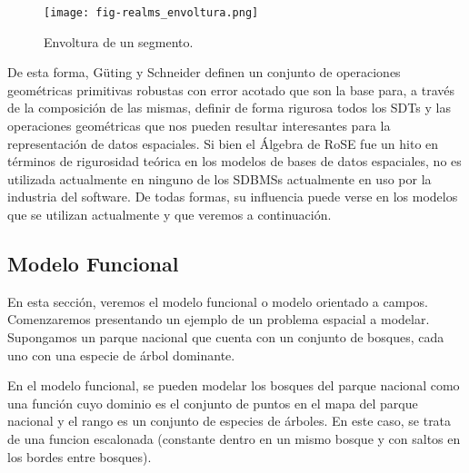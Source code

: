 \begin{figure}
    \centering
    \texttt{[image: fig-realms\_envoltura.png]}
    \caption{Envoltura de un segmento.}
    \label{fig:realms:envoltura}
\end{figure}

De esta forma, Güting y Schneider definen un conjunto de operaciones geométricas primitivas robustas con error acotado que son la base para,
a través de la composición de las mismas, definir de forma rigurosa todos los SDTs
y las operaciones geométricas que nos pueden resultar interesantes para la representación de datos espaciales.
Si bien el Álgebra de RoSE fue un hito en términos de rigurosidad teórica en los modelos de bases de datos espaciales,
no es utilizada actualmente en ninguno de los SDBMSs actualmente en uso por la industria del software.
De todas formas, su influencia puede verse en los modelos que se utilizan actualmente y que veremos a continuación.

\subsection{Modelo Funcional}

En esta sección, veremos el modelo funcional o modelo orientado a campos.
Comenzaremos presentando un ejemplo de un problema espacial a modelar. Supongamos un parque nacional que cuenta con
un conjunto de bosques, cada uno con una especie de árbol dominante.

En el modelo funcional, se pueden modelar los bosques del parque nacional como
una función cuyo dominio es el conjunto de puntos en el mapa del parque nacional y el rango es un conjunto de especies de árboles.
En este caso, se trata de una funcion escalonada (constante dentro en un mismo bosque y con saltos en los bordes entre bosques).


